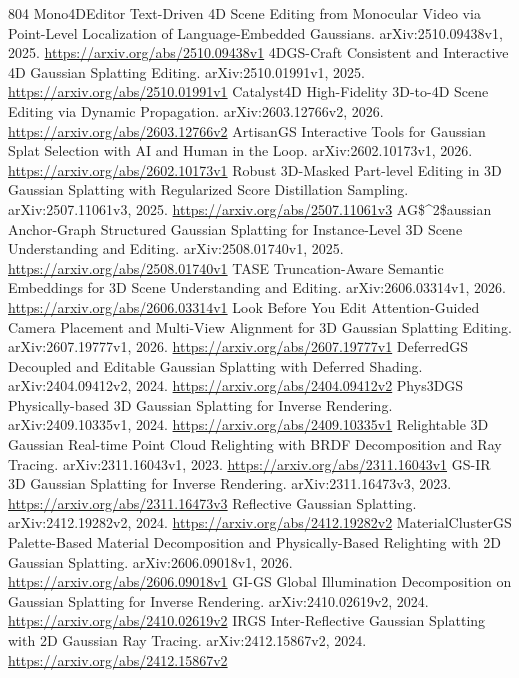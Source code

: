 \documentclass[11pt]{article}
\begin{document}
\begin{thebibliography}{804}
 Mono4DEditor Text-Driven 4D Scene Editing from Monocular Video via Point-Level Localization of Language-Embedded Gaussians. arXiv:2510.09438v1, 2025. \url{https://arxiv.org/abs/2510.09438v1}
 4DGS-Craft Consistent and Interactive 4D Gaussian Splatting Editing. arXiv:2510.01991v1, 2025. \url{https://arxiv.org/abs/2510.01991v1}
 Catalyst4D High-Fidelity 3D-to-4D Scene Editing via Dynamic Propagation. arXiv:2603.12766v2, 2026. \url{https://arxiv.org/abs/2603.12766v2}
 ArtisanGS Interactive Tools for Gaussian Splat Selection with AI and Human in the Loop. arXiv:2602.10173v1, 2026. \url{https://arxiv.org/abs/2602.10173v1}
 Robust 3D-Masked Part-level Editing in 3D Gaussian Splatting with Regularized Score Distillation Sampling. arXiv:2507.11061v3, 2025. \url{https://arxiv.org/abs/2507.11061v3}
 AG\$\textasciicircum{}2\$aussian Anchor-Graph Structured Gaussian Splatting for Instance-Level 3D Scene Understanding and Editing. arXiv:2508.01740v1, 2025. \url{https://arxiv.org/abs/2508.01740v1}
 TASE Truncation-Aware Semantic Embeddings for 3D Scene Understanding and Editing. arXiv:2606.03314v1, 2026. \url{https://arxiv.org/abs/2606.03314v1}
 Look Before You Edit Attention-Guided Camera Placement and Multi-View Alignment for 3D Gaussian Splatting Editing. arXiv:2607.19777v1, 2026. \url{https://arxiv.org/abs/2607.19777v1}
 DeferredGS Decoupled and Editable Gaussian Splatting with Deferred Shading. arXiv:2404.09412v2, 2024. \url{https://arxiv.org/abs/2404.09412v2}
 Phys3DGS Physically-based 3D Gaussian Splatting for Inverse Rendering. arXiv:2409.10335v1, 2024. \url{https://arxiv.org/abs/2409.10335v1}
 Relightable 3D Gaussian Real-time Point Cloud Relighting with BRDF Decomposition and Ray Tracing. arXiv:2311.16043v1, 2023. \url{https://arxiv.org/abs/2311.16043v1}
 GS-IR 3D Gaussian Splatting for Inverse Rendering. arXiv:2311.16473v3, 2023. \url{https://arxiv.org/abs/2311.16473v3}
 Reflective Gaussian Splatting. arXiv:2412.19282v2, 2024. \url{https://arxiv.org/abs/2412.19282v2}
 MaterialClusterGS Palette-Based Material Decomposition and Physically-Based Relighting with 2D Gaussian Splatting. arXiv:2606.09018v1, 2026. \url{https://arxiv.org/abs/2606.09018v1}
 GI-GS Global Illumination Decomposition on Gaussian Splatting for Inverse Rendering. arXiv:2410.02619v2, 2024. \url{https://arxiv.org/abs/2410.02619v2}
 IRGS Inter-Reflective Gaussian Splatting with 2D Gaussian Ray Tracing. arXiv:2412.15867v2, 2024. \url{https://arxiv.org/abs/2412.15867v2}

\end{thebibliography}
\end{document}
